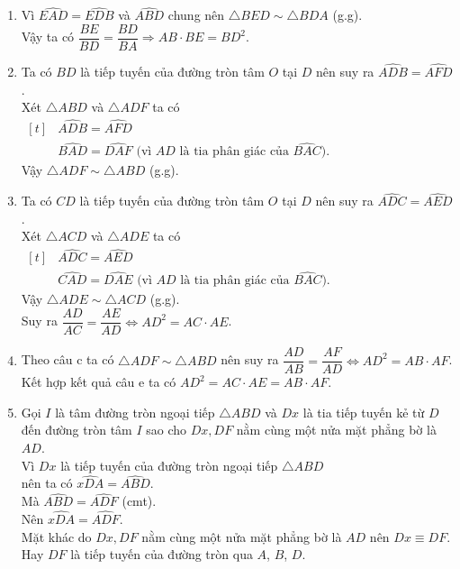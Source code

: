 \begin{bt}
{\begin{enumerate}
\begin{itemize}
			\end{itemize} 
			Suy ra $\widehat{FED}=\widehat{EDB}$ nên $EF \parallel BC$.
			\item Vì $\widehat{EAD}=\widehat{EDB}$ và $\widehat{ABD}$ chung nên $\triangle BED \sim \triangle BDA$ (g.g).\\
			Vậy ta có $\dfrac{BE}{BD}=\dfrac{BD}{BA} \Rightarrow AB \cdot BE=BD^2$.
			\item Ta có $BD$ là tiếp tuyến của đường tròn tâm $O$ tại $D$ nên suy ra $\widehat{ADB}=\widehat{AFD}$.\\
			Xét $\triangle ABD$ và $\triangle ADF$ ta có $\begin{aligned}[t]
			&\widehat{ADB}=\widehat{AFD}\\&\widehat{BAD}=\widehat{DAF} \text{ (vì } AD \text{ là tia phân giác của } \widehat{BAC}).
			\end{aligned}$\\
			Vậy $\triangle ADF \sim \triangle ABD$ (g.g). 
			\item Ta có $CD$ là tiếp tuyến của đường tròn tâm $O$ tại $D$ nên suy ra $\widehat{ADC}=\widehat{AED}$.\\
			Xét $\triangle ACD$ và $\triangle ADE$ ta có $\begin{aligned}[t]
			&\widehat{ADC}=\widehat{AED}\\&\widehat{CAD}=\widehat{DAE} \text{ (vì } AD \text{ là tia phân giác của } \widehat{BAC}).
			\end{aligned}$\\
			Vậy $\triangle ADE \sim \triangle ACD$ (g.g).\\
			Suy ra $\dfrac{AD}{AC}=\dfrac{AE}{AD} \Leftrightarrow AD^2=AC\cdot AE$.
			\item Theo câu c ta có $\triangle ADF \sim \triangle ABD$ nên suy ra $\dfrac{AD}{AB}=\dfrac{AF}{AD} \Leftrightarrow AD^2=AB\cdot AF$.\\
			Kết hợp kết quả câu e ta có $AD^2=AC\cdot AE = AB \cdot AF$.
			\item Gọi $I$ là tâm đường tròn ngoại tiếp $\triangle ABD$ và $Dx$ là tia tiếp tuyến kẻ từ $D$ đến đường tròn tâm $I$ sao cho $Dx, DF$ nằm cùng một nửa mặt phẳng bờ là $AD$.\\
			Vì $Dx$ là tiếp tuyến của đường tròn ngoại tiếp $\triangle ABD$ \\
			nên ta có $\widehat{xDA}=\widehat{ABD}$.\\
			Mà $\widehat{ABD}=\widehat{ADF} $ (cmt).\\
			Nên $\widehat{xDA} = \widehat{ADF}$.\\
			Mặt khác do $Dx, DF$ nằm cùng một nửa mặt phẳng bờ là $AD$ nên $Dx \equiv DF$.\\
			Hay $DF$ là tiếp tuyến của đường tròn qua $A$, $B$, $D$.
		\end{enumerate}	
	}
\end{bt}

